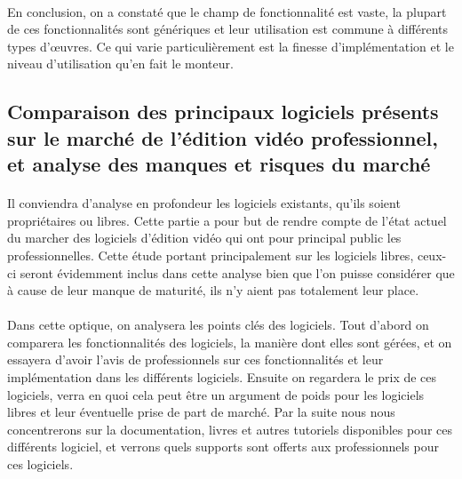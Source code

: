 \paragraph{}
\paragraph{}
En conclusion, on a constaté que le champ de fonctionnalité est vaste, la plupart de ces
fonctionnalités sont génériques et leur
utilisation est commune à différents types d'œuvres. Ce qui varie particulièrement  est
la finesse d'implémentation et le niveau d'utilisation qu'en fait le monteur.

\newpage
\subsection{Comparaison des principaux logiciels présents sur le marché de
l'édition vidéo professionnel, et analyse des manques et risques du marché}

\paragraph{}
  Il conviendra d'analyse en profondeur les logiciels existants, qu'ils soient
  propriétaires ou libres. Cette partie a pour but de rendre compte de
  l'état actuel du marcher des logiciels d'édition vidéo qui ont pour principal
  public les professionnelles. Cette étude portant principalement
  sur les logiciels libres, ceux-ci seront évidemment inclus dans cette analyse
  bien que l'on puisse considérer que à cause de leur manque de maturité, ils
  n'y aient pas totalement leur place.

\paragraph{}
  Dans cette optique, on analysera les points clés des logiciels.
  Tout d'abord on comparera les fonctionnalités des
  logiciels, la manière dont elles sont gérées, et on essayera d'avoir l'avis de
  professionnels sur ces fonctionnalités et leur implémentation dans les différents
  logiciels. Ensuite on regardera le prix de ces logiciels, verra en quoi cela
  peut être un argument de poids pour les logiciels libres et leur éventuelle
  prise de part de marché. Par la suite nous nous concentrerons sur la documentation,
  livres et autres tutoriels disponibles pour ces différents logiciel, et verrons
  quels supports sont offerts aux professionnels pour ces logiciels.

